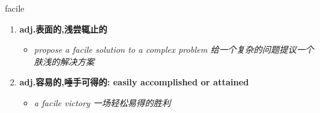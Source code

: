 
\begin{frame}
{\huge facile}
\begin{center}
\begin{enumerate}\Large
  \item \textbf{adj.表面的,浅尝辄止的}
  \begin{itemize}
    \item \em{\Large{propose a facile solution to a complex problem 给一个复杂的问题提议一个肤浅的解决方案}}
  \end{itemize}
  \item \textbf{adj.容易的,唾手可得的: easily accomplished or attained}
  \begin{itemize}
    \item \em{\Large{a facile victory 一场轻松易得的胜利}}
  \end{itemize}
\end{enumerate}
\end{center}
\end{frame}

